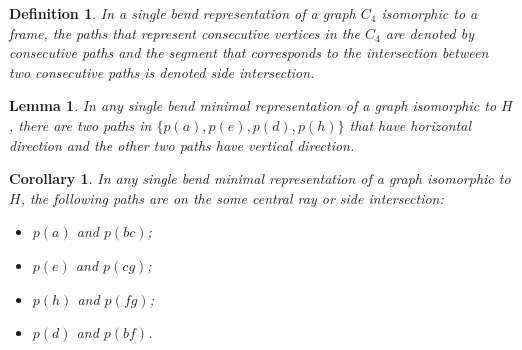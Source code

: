 \documentclass[9pt]{entcs}
\newtheorem{lema}{Lemma}[section]
\newtheorem{defi}{Definition}[section]
\newtheorem{coro}{Corollary}[section]
\newtheorem{prove}{Proof}[section]
\begin{document}
\begin{defi}
In a single bend representation of a graph $C_4$ isomorphic to a frame, the paths that represent consecutive vertices in the $C_4$ are denoted by \emph{consecutive paths} and the segment that corresponds to the intersection between two consecutive paths is denoted \emph{side intersection}.  
\end{defi}

\begin{lema}\label{lem:2vertical2horizontal}
In any single bend minimal representation of a graph isomorphic to $H$, there are two paths in $\{p(a), p(e), p(d), p(h) \}$ that have horizontal direction and the other two paths have vertical direction.
\end{lema}




\begin{coro} \label{coro:paresMesmoSegmento}
In any single bend minimal representation of a graph isomorphic to $H$, the following paths are on the some central ray or side intersection: %

\begin{itemize}
\item $p(a)$ and $p(bc)$;
\item $p(e)$ and $p(cg)$;
\item $p(h)$ and $p(fg)$;
\item $p(d)$ and $p(bf)$.
\end{itemize}
\end{coro}
\end{document}
